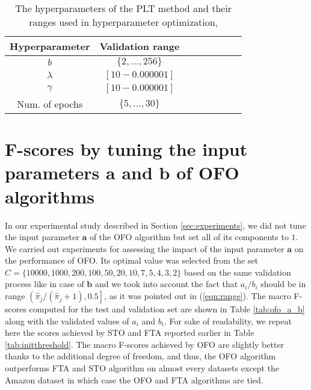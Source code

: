 \documentclass{article}
\newcommand{\ba}{\mathbf{a}}
\newcommand{\bb}{\mathbf{b}}
\newcommand{\Algo}[1]{\textsc{#1}}
\newcommand{\tableBefore}{-0pt}
\newcommand{\tableAfter}{-0pt}
\begin{document}
\vspace{\tableBefore}
\begin{table}[ht!]
\caption{The hyperparameters of the \Algo{PLT} method and their ranges used in hyperparameter optimization,}
\label{tab:hyppar}
\begin{center}
\begin{tabular}{|c|c|c|c|c|c|c|c|}
\hline
Hyperparameter & Validation range \\%
\hline
$b$ & $\{2,\dots,256\}$ \\%
$\lambda$ &  $[10 - 0.000001]$ \\%
$\gamma$ &  $[10 - 0.000001]$ \\%
Num. of epochs &  $\{ 5, \dots , 30\} $ \\
\hline
\end{tabular}
\end{center}
\end{table}
\vspace{\tableAfter}




\section{F-scores by tuning the input parameters $\ba$ and $\bb$ of \Algo{OFO} algorithms}
\label{sec:OFO_a_b}

In our experimental study described in Section \ref{sec:experiments}, we did not tune the input parameter $\ba$ of the \Algo{OFO} algorithm but set all of its components to $1$. We carried out experiments for assessing the impact of the input parameter $\ba$ on the performance of \Algo{OFO}. Its optimal value was selected from the set $C = \{10000,1000,200,100,50,20,10,7,5,4,3,2\}$ based on the same validation process like in case of $\bb$ and we took into account the fact that $a_i /b_i$ should be in range $\left (\hat\pi_j / (\hat\pi_j + 1), 0.5 \right ]$, as it was pointed out in (\ref{eqn:range}). The macro F-scores computed for the test and validation set are shown in Table \ref{tab:ofo_a_b} along with the validated values of $a_i$ and $b_i$. For sake of readability, we repeat here the scores achieved by \Algo{STO} and \Algo{FTA} reported earlier in Table \ref{tab:initthreshold}. The macro F-scores achieved by \Algo{OFO} are slightly better thanks to the additional degree of freedom, and thus, the \Algo{OFO} algorithm outperforms \Algo{FTA} and \Algo{STO} algorithm on almost every datasets except the Amazon dataset in which case the \Algo{OFO} and \Algo{FTA} algorithms are tied.
\end{document}
